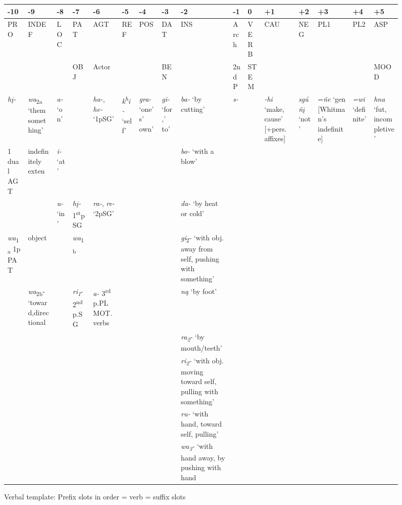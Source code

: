 \documentclass[output=paper]{LSP/langsci}
\begin{document}
\begin{sidewaysfigure}
\caption{Verbal template: Prefix slots in order = verb = suffix slots}
\scriptsize
\begin{tabularx}{\textwidth}{  X  p{1.5cm}  X  p{1cm}  p{.7cm}  p{.5cm}  X   X  p{2cm} l l   p{1cm}  X  p{1cm}  X  X }
\midrule
-10 & -9 & -8 & -7 & -6 & -5 & -4 & -3 & -2 & -1 & 0 & +1 & +2 & +3 & +4 & +5 \\
\midrule
PRO & INDEF & LOC & PAT & AGT & REF & POS & DAT & INS & Arch & VERB & CAU & NEG & PL1 & PL2 & ASP \\
& & & OBJ & Actor & & & BEN & & 2ndP & STEM & & & & & MOOD \\
\midrule
\textit{h\k{i}-} & \textit{wa}\textsubscript{2a}  `them  something'& \textit{a-} `on' &  & \textit{ha-}, \textit{he-}  `1pSG'  & \textit{k\textsuperscript{h}i-}  `self' & \textit{gra-}  `one's'  own'& \textit{gi-}  `for,' to' & \textit{ba-} `by cutting' & \textit{s-} & & \textit{-hi} `make,  cause' [+pers. affixes]  & \textit{sg\'u\~n\k{i}}  `not'& =\textit{\~ne}  `gen [Whitman's indefinite] & \textit{=wi}  `definite' & \textit{hna} `fut,  incompletive'  \\
1 dual AGT & indefinitely  exten  & \textit{i-} `at' & && &&& \textit{bo-} `with a blow' & & && &  &  & \\ 
&& \textit{u-} `in' & \textit{h\k{i}-}  1\textsuperscript{st}p  SG & \textit{ra-}, \textit{re-}  `2pSG'  & & & & \textit{da-} `by heat  or cold'  & & & & &   & & \\ 
\textit{wa}\textsubscript{1a} 1p PAT & object & & \textit{wa}\textsubscript{1b} &  & & &  &  \textit{gi}\textsubscript{2}- `with  obj. away  from self,   pushing   with something'& & & & & & & \\
& \textit{wa}\textsubscript{2b}-  `toward,directional  & & \textit{ri\textsubscript{1}}-  2\textsuperscript{nd}  p.SG & \textit{a-}  3\textsuperscript{rd} p.PL  MOT. verbs   &  && & \textit{n\k{a}} `by foot' & & & & & & &\\
& & & & & & & & \textit{ra\textsubscript{2}-} `by mouth/teeth'  & & & & & & & \\ 
\midrule
& & & & & & & & \textit{ri\textsubscript{2}-} `with obj.  moving  toward self, pulling with  something' & & & & & & & \\ 
& & & & & & & & \textit{ru-} `with  hand, toward  self, pulling' & & & & & & & \\ 
& & & & & & & & \textit{wa\textsubscript{3}-} `with  hand away, by pushing  with hand& & & & & & & \\ 
\midrule
\end{tabularx}
\end{sidewaysfigure}
\end{document}
